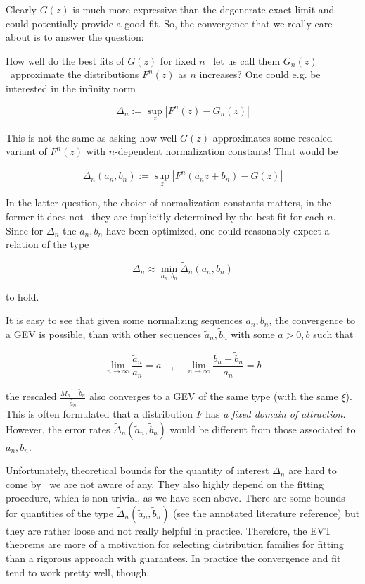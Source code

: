 Clearly $G(z)$ is much more expressive than the degenerate exact limit and could
potentially provide a good fit. So, the convergence that we really care about is
to answer the question:

How well do the best fits of $G(z)$ for fixed $n$ \textemdash\ let us call them
$G_n(z)$ \textemdash\ approximate the distributions $F^n(z)$ as $n$ increases?
One could e.g. be interested in the infinity norm

\begin{equation}
  \Delta_n := \sup_z | F^n(z) - G_n(z) |
\end{equation}


This is not the same as asking how well $G(z)$ approximates some rescaled
variant of $F^n(z)$ with $n$-dependent normalization constants! That would be


\begin{equation}
  \tilde{\Delta}_n(a_n, b_n) := \sup_z |F^n(a_n z + b_n) - G(z) |
\end{equation}


In the latter question, the choice of normalization constants matters, in the
former it does not \textemdash\ they are implicitly determined by the best fit for each
$n$. Since for $\Delta_n$ the $a_n, b_n$ have been optimized, one could
reasonably expect a relation of the type


\begin{equation}
  \Delta_n \approx \min_{a_n, b_n} \tilde{\Delta}_n(a_n, b_n)
\end{equation}


to hold.

It is easy to see that given some normalizing sequences $a_n, b_n$, the
convergence to a GEV is possible, than with other sequences $\tilde{a}_n,
\tilde{b}_n$ with some $a>0, b$ such that


\begin{equation}
  \lim_{n\rightarrow \infty} \frac{\tilde{a}_n}{a_n} = a \quad,\quad \lim_{n \rightarrow \infty} \frac{b_n-\tilde{b}_n}{a_n} = b
\end{equation}


the rescaled $\frac{M_n-\tilde{b}_n}{\tilde{a_n}}$ also converges to a GEV of
the same type (with the same $\xi$). This is often formulated that a
distribution $F$ has \textit{a fixed domain of attraction}. However, the error rates
$\tilde{\Delta}_n(\tilde{a}_n, \tilde{b}_n)$ would be different from those
associated to $a_n, b_n$.

Unfortunately, theoretical bounds for the quantity of interest $\Delta_n$ are
hard to come by \textemdash\ we are not aware of any. They also highly depend on the
fitting procedure, which is non-trivial, as we have seen above. There are some
bounds for quantities of the type $\tilde{\Delta}_n(\tilde{a}_n, \tilde{b}_n)$
(see the annotated literature reference) but they are rather loose and not
really helpful in practice. Therefore, the EVT theorems are more of a motivation
for selecting distribution families for fitting than a rigorous approach with
guarantees. In practice the convergence and fit tend to work pretty well,
though.
